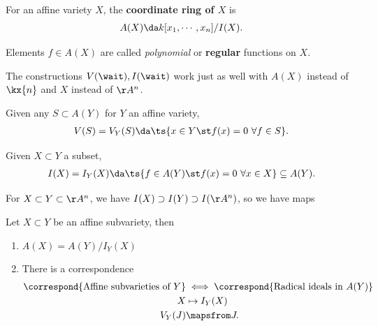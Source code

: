 \begin{definition}

For an affine variety \(X\), the \textbf{coordinate ring of \(X\)} is
\begin{align*}  
A(X) \da k[x_1, \cdots, x_n]/ I(X)
.\end{align*}

Elements \(f\in A(X)\) are called \emph{polynomial} or \textbf{regular}
functions on \(X\).

\end{definition}

\begin{observation}

The constructions \(V(\wait), I(\wait)\) work just as well with \(A(X)\)
instead of \(\kx{n}\) and \(X\) instead of \(\AA^n\).

Given any \(S\subset A(Y)\) for \(Y\) an affine variety,
\begin{align*}  
V(S) = V_Y(S) \da\ts{x\in Y \st f(x) = 0\,\,\forall f\in S}
.\end{align*}

Given \(X\subset Y\) a subset,
\begin{align*}  
I(X) = I_Y(X) \da\ts{f\in A(Y) \st f(x) = 0\,\,\forall x\in X} \subseteq A(Y)
.\end{align*}

\end{observation}

\begin{example}

For \(X\subset Y \subset \AA^n\), we have
\(I(X) \supset I(Y) \supset I(\AA^n)\), so we have maps

\begin{center}
\end{center}

\end{example}

\begin{theorem}

Let \(X\subset Y\) be an affine subvariety, then

\begin{enumerate}
\def\labelenumi{\alph{enumi}.}
\item
  \(A(X) = A(Y) / I_Y(X)\)
\item
  There is a correspondence
  \begin{align*}  
  \correspond{\text{Affine subvarieties of }Y} 
  &\iff \correspond{\text{Radical ideals in }A(Y)} \\
  X &\mapsto I_Y(X) \\
  V_Y(J) &\mapsfrom J
  .\end{align*}
\end{enumerate}

\end{theorem}


